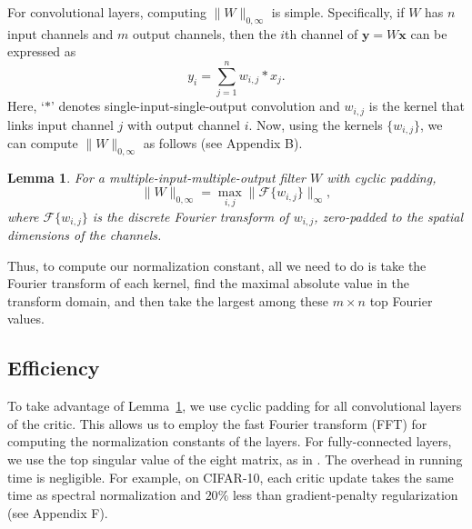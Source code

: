 \documentclass[letterpaper]{article} %
\newtheorem{lemma}{Lemma}
\begin{document}
For convolutional layers, computing $\|W\|_{0,\infty}$ is simple. Specifically, if $W$ has $n$ input channels and $m$ output channels, then the $i$th channel of $\boldsymbol{y}=W\boldsymbol{x}$ can be expressed as
\begin{equation}
y_i = \sum_{j=1}^n w_{i,j}*x_j.
\end{equation}
Here, `$*$' denotes single-input-single-output convolution and $w_{i,j}$ is the kernel that links input channel $j$ with output channel $i$. Now, using the kernels $\{w_{i,j}\}$, we can compute $\|W\|_{0,\infty}$ as follows  (see Appendix B).

\begin{lemma}\label{lem:SparseNorm}
	For a multiple-input-multiple-output filter $W$ with cyclic padding,
\begin{equation}
\|W\|_{0,\infty} = \max_{i,j}\|\mathcal{F}\{w_{i,j}\}\|_\infty,
\label{eq:lemma}
\end{equation}
where $\mathcal{F}\{w_{i,j}\}$ is the discrete Fourier transform of $w_{i,j}$, zero-padded to the spatial dimensions of the channels.
\end{lemma}

Thus, to compute our normalization constant, all we need to do is take the Fourier transform of each kernel, find the maximal absolute value in the transform domain, and then take the largest among these $m\times n$ top Fourier values.


\subsection{Efficiency}

To take advantage of Lemma~\ref{lem:SparseNorm}, we use cyclic padding for all convolutional layers of the critic. This allows us to employ the fast Fourier transform (FFT) for computing the normalization constants of the layers. For  fully-connected layers, we use the top singular value of the eight matrix, as in \cite{spectral}. The overhead in running time is negligible. For example, on CIFAR-10, each critic update takes the same time as spectral normalization and $20\%$ less than gradient-penalty regularization (see Appendix F).
\end{document}
